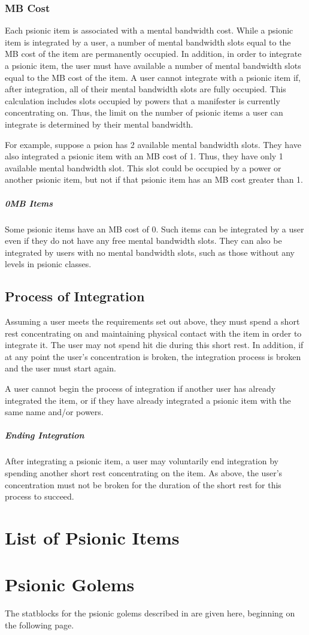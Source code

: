 \subsubsection{MB Cost}
Each psionic item is associated with a mental bandwidth cost.
While a psionic item is integrated by a user,
a number of mental bandwidth slots equal to the MB cost of the item
are permanently occupied.
In addition, in order to integrate a psionic item,
the user must have available a number of mental bandwidth slots
equal to the MB cost of the item.
A user cannot integrate with a psionic item if, after integration,
all of their mental bandwidth slots are fully occupied.
This calculation includes slots occupied by powers that a manifester
is currently concentrating on.
Thus,
the limit on the number of psionic items a user can integrate
is determined by their mental bandwidth.

For example,
suppose a psion has 2 available mental bandwidth slots.
They have also integrated a psionic item with an MB cost of 1.
Thus, they have only 1 available mental bandwidth slot.
This slot could be occupied by a power or another psionic item,
but not if that psionic item has an MB cost greater than 1.

\subparagraph{0MB Items}
    Some psionic items have an MB cost of 0.
    Such items can be integrated by a user even if they do not
    have any free mental bandwidth slots.
    They can also be integrated by users with no mental bandwidth slots,
    such as those without any levels in psionic classes.

\subsection{Process of Integration}
Assuming a user meets the requirements set out above,
they must spend a short rest concentrating on and maintaining physical contact with
the item in order to integrate it.
The user may not spend hit die during this short rest.
In addition, if at any point the user's concentration is broken,
the integration process is broken and the user must start again.

A user cannot begin the process of integration if another user has already
integrated the item, or if they have already integrated a psionic item
with the same name and/or powers. 

\subparagraph{Ending Integration}
    After integrating a psionic item,
    a user may voluntarily end integration by spending another short rest
    concentrating on the item. As above, the user's concentration must not be
    broken for the duration of the short rest for this process to succeed.

\section{List of Psionic Items}


\section{Psionic Golems}
\label{sec:psionic_golem}
The statblocks for the psionic golems described in
are given here, beginning on the following page.

\clearpage

